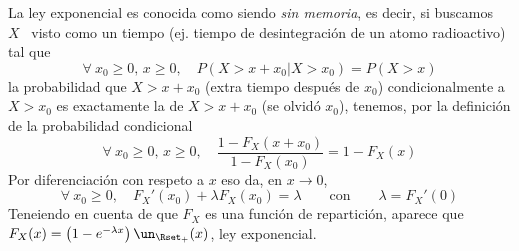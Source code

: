 La  ley exponencial  es conocida  como siendo  {\em sin  memoria}, es  decir, si
buscamos \  $X$ \  visto como un  tiempo (ej.  tiempo de desintegraci\'on  de un
atomo radioactivo) tal que
%
\[
\forall \: x_0 \ge 0, \, x \ge 0, \quad P( X > x+x_0 | X > x_0) = P(X > x)
\]
%
\ie  la  probabilidad  que  $X  >  x+x_0$  (extra  tiempo  despu\'es  de  $x_0$)
condicionalmente  a $X >  x_0$ es  exactamente la  de $X  > x+x_0$  (se olvid\'o
$x_0$), tenemos, por la definici\'on de la probabilidad condicional
%
\[
\forall \: x_0 \ge 0, \, x \ge 0, \quad \frac{1-F_X(x+x_0)}{1-F_X(x_0)} = 1-F_X(x)
\]
%
Por diferenciaci\'on con respeto a $x$ eso da, en $x \to 0$,
%
\[
\forall  \: x_0  \ge 0,  \quad  F_X'(x_0) +  \lambda F_X(x_0)  = \lambda  \qquad
\mbox{con} \qquad \lambda = F_X'(0)
\]
%
Teneiendo en cuenta de que $F_X$  es una funci\'on de repartici\'on, aparece que
$F_X(x) = \left( 1 - e^{-\lambda x} \right) \un_{\Rset_+}(x)$, ley exponencial.


